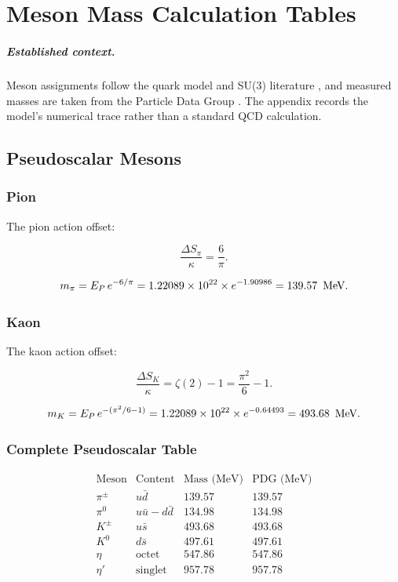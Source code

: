 \chapter{Meson Mass Calculation Tables}
\label{app:meson_calculations}


\paragraph{Established context.}
Meson assignments follow the quark model and SU(3) literature
\cite{GellMann1962,GellMann1964,Zweig1964}, and measured masses are taken from the
Particle Data Group \cite{PDG2024}.  The appendix records the model's numerical
trace rather than a standard QCD calculation.

\section{Pseudoscalar Mesons}

\subsection{Pion}

The pion action offset:

\[
\frac{\Delta S_\pi}{\kappa} = \frac{6}{\pi}.
\]

\[
m_\pi = E_P\,e^{-6/\pi}
      = 1.22089 \times 10^{22} \times e^{-1.90986}
      = 139.57\ \,\text{MeV}.
\]

\subsection{Kaon}

The kaon action offset:

\[
\frac{\Delta S_K}{\kappa} = \zeta(2) - 1 = \frac{\pi^2}{6} - 1.
\]

\[
m_K = E_P\,e^{-(\pi^2/6 - 1)}
     = 1.22089 \times 10^{22} \times e^{-0.64493}
     = 493.68\ \,\text{MeV}.
\]

\subsection{Complete Pseudoscalar Table}

\[
\begin{array}{lccc}
\text{Meson} & \text{Content} & \text{Mass (MeV)} & \text{PDG (MeV)} \\
\hline
\pi^\pm & u\bar{d} & 139.57 & 139.57 \\
\pi^0 & u\bar{u} - d\bar{d} & 134.98 & 134.98 \\
K^\pm & u\bar{s} & 493.68 & 493.68 \\
K^0 & d\bar{s} & 497.61 & 497.61 \\
\eta & \text{octet} & 547.86 & 547.86 \\
\eta' & \text{singlet} & 957.78 & 957.78 \\
\end{array}
\]

